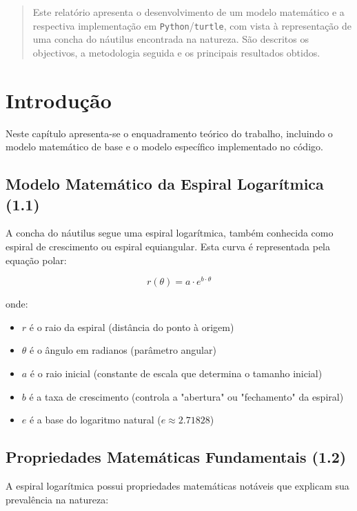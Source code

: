 \documentclass[12pt,a4paper,oneside]{extarticle}
\begin{document}


\begin{abstract}
Este relatório apresenta o desenvolvimento de um modelo matemático e a respectiva implementação em \texttt{Python}/\texttt{turtle}, com vista à representação de uma concha do náutilus encontrada na natureza. São descritos os objectivos, a metodologia seguida e os principais resultados obtidos. 
\end{abstract}

\section{Introdução}
Neste capítulo apresenta-se o enquadramento teórico do trabalho, incluindo o modelo matemático de base e o modelo específico implementado no código.

\subsection{Modelo Matemático da Espiral Logarítmica (1.1)}
A concha do náutilus segue uma espiral logarítmica, também conhecida como espiral de crescimento ou espiral equiangular. Esta curva é representada pela equação polar:

\begin{equation}
r(\theta) = a \cdot e^{b \cdot \theta}
\label{eq:espiral}
\end{equation}

\noindent onde:
\begin{itemize}
    \item $r$ é o raio da espiral (distância do ponto à origem)
    \item $\theta$ é o ângulo em radianos (parâmetro angular)
    \item $a$ é o raio inicial (constante de escala que determina o tamanho inicial)
    \item $b$ é a taxa de crescimento (controla a "abertura" ou "fechamento" da espiral)
    \item $e$ é a base do logaritmo natural ($e \approx 2.71828$)
\end{itemize}

\subsection{Propriedades Matemáticas Fundamentais (1.2)}
A espiral logarítmica possui propriedades matemáticas notáveis que explicam sua prevalência na natureza:
\end{document}
